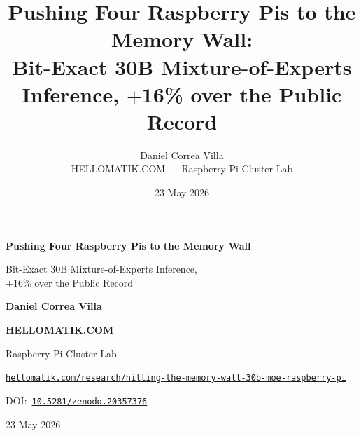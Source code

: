 \documentclass[10pt,a4paper]{article}
\title{Pushing Four Raspberry Pis to the Memory Wall:\\[0.15cm]
       Bit-Exact 30B Mixture-of-Experts Inference, $+$16\% over the Public Record}
\author{Daniel Correa Villa\\
  \small HELLOMATIK.COM --- Raspberry Pi Cluster Lab}
\date{23 May 2026}
\begin{document}
\thispagestyle{plain}
\vspace*{3.5cm}
\begin{center}
  {\LARGE\bfseries Pushing Four Raspberry Pis to the Memory Wall\par}
  \vspace{0.4cm}
  {\large Bit-Exact 30B Mixture-of-Experts Inference,\\[0.15cm]
   $+$16\% over the Public Record\par}
  \vspace{1.8cm}
  {\LARGE\bfseries Daniel Correa Villa\par}
  \vspace{0.5cm}
  {\LARGE\bfseries HELLOMATIK.COM\par}
  \vspace{0.2cm}
  {\large Raspberry Pi Cluster Lab\par}
  \vspace{0.6cm}
  {\small\href{https://hellomatik.com/research/hitting-the-memory-wall-30b-moe-raspberry-pi}{\texttt{hellomatik.com/research/\allowbreak hitting-the-memory-wall-30b-moe-raspberry-pi}}\par}
  \vspace{0.35cm}
  {\small DOI:~\href{https://doi.org/10.5281/zenodo.20357376}{\texttt{10.5281/zenodo.20357376}}\par}
  \vspace{1.25cm}
  {\small 23 May 2026\par}
\end{center}
\newpage

\setcounter{tocdepth}{2}
\tableofcontents
\newpage
\end{document}
